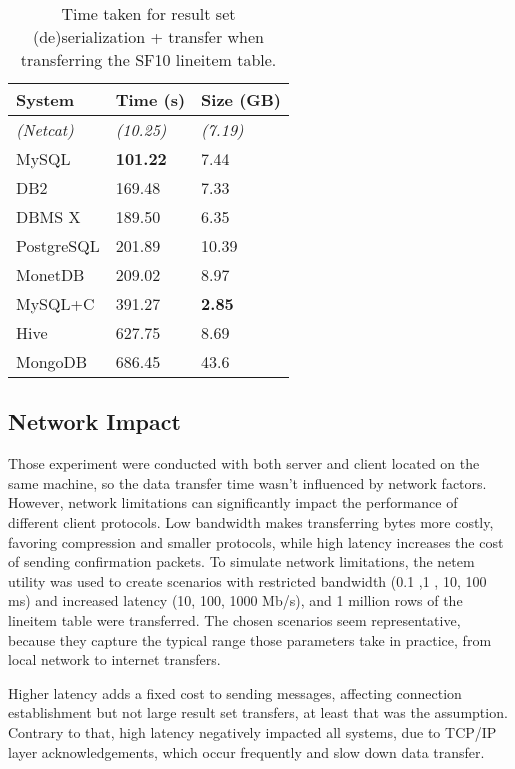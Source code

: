 \documentclass[sigconf]{acmart}
\begin{document}
\begin{table}[h!]
    \centering
    \caption{Time taken for result set (de)serialization + transfer when transferring the SF10 lineitem table.}
    \begin{tabular}{ p{2cm} | p{2cm}  p{2cm} }
        \textbf{System} & \textbf{Time (s)} & \textbf{Size (GB)} \\ \hline
        \textit{(Netcat)} & \textit{(10.25)} & \textit{(7.19)} \\ \hline
        MySQL & \textbf{101.22} & 7.44 \\ \hline
        DB2 & 169.48 & 7.33 \\ \hline
        DBMS X & 189.50 & 6.35 \\ \hline
        PostgreSQL & 201.89 & 10.39 \\ \hline
        MonetDB & 209.02 & 8.97 \\ \hline
        MySQL+C & 391.27 & \textbf{2.85} \\ \hline
        Hive & 627.75 & 8.69 \\ \hline
        MongoDB & 686.45 & 43.6
    \end{tabular}
\end{table}

\subsection{Network Impact}
Those experiment were conducted with both server and client located on the same machine, so the data transfer time wasn't influenced by network factors. However, network limitations can significantly impact the performance of different client protocols. Low bandwidth makes transferring bytes more costly, favoring compression and smaller protocols, while high latency increases the cost of sending confirmation packets.
To simulate network limitations, the netem \cite{hemminger2005netem} utility was used to create scenarios with restricted bandwidth (0.1 ,1 , 10, 100 ms) and increased latency (10, 100, 1000 Mb/s), and 1 million rows of the lineitem table were transferred. The chosen scenarios seem representative, because they capture the typical range those parameters take in practice, from local network to internet transfers.

Higher latency adds a fixed cost to sending messages, affecting connection establishment but not large result set transfers, at least that was the assumption. Contrary to that, high latency negatively impacted all systems, due to TCP/IP layer acknowledgements, which occur frequently and slow down data transfer.
\end{document}
